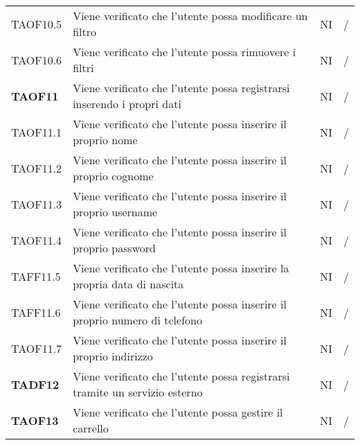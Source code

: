 \begin{center}
\begin{longtable}[!h]{p{60px} p{240px} p{35px} p{35px}}
        TAOF10.5        & Viene verificato che l'utente possa modificare un filtro                                                             & NI             & /              \\
        TAOF10.6        & Viene verificato che l'utente possa rimuovere i filtri                                                               & NI             & /              \\
        \textbf{TAOF11} & Viene verificato che l'utente possa registrarsi inserendo i propri dati                                              & NI             & /              \\
        TAOF11.1        & Viene verificato che l'utente possa inserire il proprio nome                                                         & NI             & /              \\
        TAOF11.2        & Viene verificato che l'utente possa inserire il proprio cognome                                                      & NI             & /              \\
        TAOF11.3        & Viene verificato che l'utente possa inserire il proprio username                                                     & NI             & /              \\
        TAOF11.4        & Viene verificato che l'utente possa inserire il proprio password                                                     & NI             & /              \\
        TAFF11.5        & Viene verificato che l'utente possa inserire la propria data di nascita                                              & NI             & /              \\
        TAFF11.6        & Viene verificato che l'utente possa inserire il proprio numero di telefono                                           & NI             & /              \\
        TAOF11.7        & Viene verificato che l'utente possa inserire il proprio indirizzo                                                    & NI             & /              \\
        \textbf{TADF12} & Viene verificato che l'utente possa registrarsi tramite un servizio esterno                                          & NI             & /              \\
        \textbf{TAOF13} & Viene verificato che l'utente possa gestire il carrello                                                              & NI             & /              \\

\end{longtable}
\end{center}
